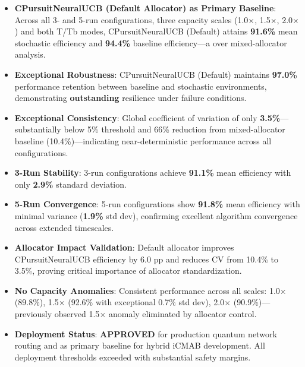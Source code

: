 \documentclass[12pt,a4paper]{article}
\newcommand{\primarytext}[1]{\textcolor{primaryblue}{\textbf{#1}}}
\newcommand{\success}[1]{\textcolor{accentgreen}{\textbf{#1}}}
\begin{document}
\begin{tcolorbox}[colback=highlightgray,colframe=primaryblue,title=\textbf{Executive Summary - Key Findings (Default Allocator Only)}]
\begin{itemize}
    \item \primarytext{CPursuitNeuralUCB (Default Allocator) as Primary Baseline}: Across all 3- and 5-run configurations, three capacity scales (1.0$\times$, 1.5$\times$, 2.0$\times$) and both T/Tb modes, CPursuitNeuralUCB (Default) attains \success{91.6\%} mean stochastic efficiency and \success{94.4\%} baseline efficiency—a  over mixed-allocator analysis.
    
    \item \success{Exceptional Robustness}: CPursuitNeuralUCB (Default) maintains \success{97.0\%} performance retention between baseline and stochastic environments, demonstrating \textbf{outstanding} resilience under failure conditions.
    
    \item \success{Exceptional Consistency}: Global coefficient of variation of only \success{3.5\%}—substantially below 5\% threshold and 66\% reduction from mixed-allocator baseline (10.4\%)—indicating near-deterministic performance across all configurations.
    
    \item \success{3-Run Stability}: 3-run configurations achieve \success{91.1\%} mean efficiency with only \success{2.9\%} standard deviation.
    
    \item \success{5-Run Convergence}: 5-run configurations show \success{91.8\%} mean efficiency with minimal variance (\success{1.9\%} std dev), confirming excellent algorithm convergence across extended timescales.
    
    \item \success{Allocator Impact Validation}: Default allocator improves CPursuitNeuralUCB efficiency by 6.0 pp and reduces CV from 10.4\% to 3.5\%, proving critical importance of allocator standardization.
    
    \item \success{No Capacity Anomalies}: Consistent performance across all scales: 1.0$\times$ (89.8\%), 1.5$\times$ (92.6\% with exceptional 0.7\% std dev), 2.0$\times$ (90.9\%)—previously observed 1.5$\times$ anomaly eliminated by allocator control.
    
    \item \success{Deployment Status}: \textbf{APPROVED} for production quantum network routing and as primary baseline for hybrid iCMAB development. All deployment thresholds exceeded with substantial safety margins.
\end{itemize}
\end{tcolorbox}
\end{document}
